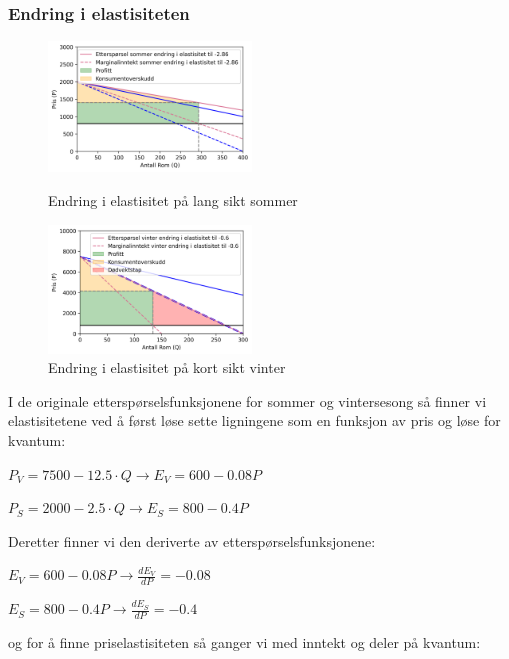 \documentclass[
  12pt,
  a4paper,
  DIV=11,
  numbers=noendperiod]{scrartcl}
\begin{document}
\clearpage

\subsubsection{Endring i elastisiteten}\label{endring-i-elastisiteten}

\begin{figure}
  \includegraphics[width=0.48\textwidth]{dokumentobjekter/figurer/prisdiskriminerin_elas_sommer.png}
  \caption{Endring i elastisitet på lang sikt sommer}
  \label{fig:elas_sommer_kort}
  \includegraphics[width=0.48\textwidth]{dokumentobjekter/figurer/prisdiskriminering_elas_vinter}
  \caption{Endring i elastisitet på kort sikt vinter}
  \label{fig:elas_vinter_lang}
  \vspace{-14mm}
\end{figure}

I de originale etterspørselsfunksjonene for sommer og vintersesong så
finner vi elastisitetene ved å først løse sette ligningene som en
funksjon av pris og løse for kvantum:

\(P_V = 7500 - 12.5 \cdot Q \rightarrow E_V = 600 - 0.08P\)

\(P_S = 2000 - 2.5 \cdot Q \rightarrow E_S = 800 - 0.4P\)

Deretter finner vi den deriverte av etterspørselsfunksjonene:

\(E_V = 600 - 0.08P \rightarrow \frac{dE_V}{dP} = -0.08\)

\(E_S = 800 - 0.4P \rightarrow \frac{dE_S}{dP} = -0.4\)

og for å finne priselastisiteten så ganger vi med inntekt og deler på
kvantum:
\end{document}
